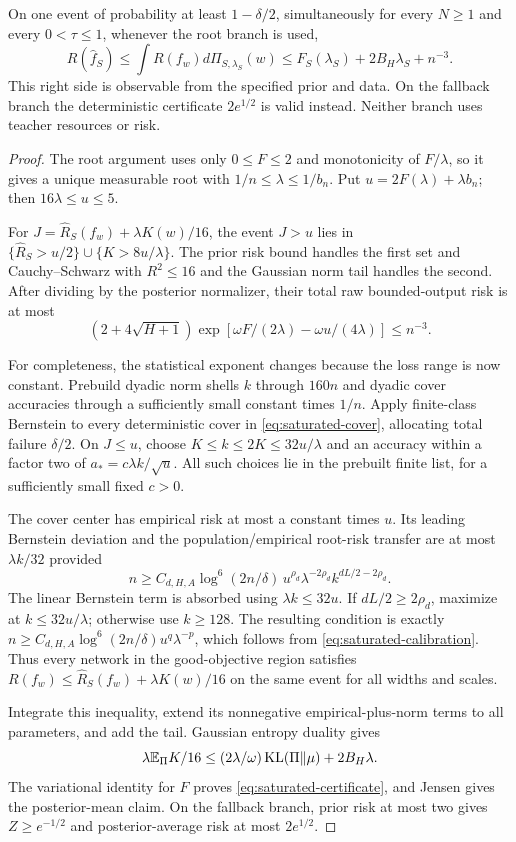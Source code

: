 \begin{theorem}
\label{thm:saturated-certificate}
On one event of probability at least $1-\delta/2$, simultaneously for every $N\ge1$ and every $0<\tau\le1$, whenever the root branch is used,
\begin{equation}
 R(\widehat f_S)\le\int R(f_w)d\Pi_{S,\lambda_S}(w)
 \le F_S(\lambda_S)+2B_H\lambda_S+n^{-3}.
 \label{eq:saturated-certificate}
\end{equation}
This right side is observable from the specified prior and data. On the fallback branch the deterministic certificate $2e^{1/2}$ is valid instead. Neither branch uses teacher resources or risk.
\end{theorem}
\begin{proof}
The root argument uses only $0\le F\le2$ and monotonicity of $F/\lambda$, so it gives a unique measurable root with $1/n\le\lambda\le1/b_n$. Put $u=2F(\lambda)+\lambda b_n$; then $16\lambda\le u\le5$.

For $J=\widehat R_S(f_w)+\lambda K(w)/16$, the event $J>u$ lies in $\{\widehat R_S>u/2\}\cup\{K>8u/\lambda\}$. The prior risk bound handles the first set and Cauchy--Schwarz with $R^2\le16$ and the Gaussian norm tail handles the second. After dividing by the posterior normalizer, their total raw bounded-output risk is at most
\[
 (2+4\sqrt{H+1})\exp[\omega F/(2\lambda)-\omega u/(4\lambda)]
 \le n^{-3}.
\]

For completeness, the statistical exponent changes because the loss range is now constant. Prebuild dyadic norm shells $k$ through $160n$ and dyadic cover accuracies through a sufficiently small constant times $1/n$. Apply finite-class Bernstein to every deterministic cover in \eqref{eq:saturated-cover}, allocating total failure $\delta/2$. On $J\le u$, choose $K\le k\le2K\le32u/\lambda$ and an accuracy within a factor two of $a_*=c\lambda k/\sqrt u$. All such choices lie in the prebuilt finite list, for a sufficiently small fixed $c>0$.

The cover center has empirical risk at most a constant times $u$. Its leading Bernstein deviation and the population/empirical root-risk transfer are at most $\lambda k/32$ provided
\[
 n\ge C_{d,H,A}\log^6(2n/\delta)\,
 u^{\rho_d}\lambda^{-2\rho_d}k^{dL/2-2\rho_d}.
\]
The linear Bernstein term is absorbed using $\lambda k\le32u$. If $dL/2\ge2\rho_d$, maximize at $k\le32u/\lambda$; otherwise use $k\ge128$. The resulting condition is exactly
$n\ge C_{d,H,A}\log^6(2n/\delta)u^q\lambda^{-p}$, which follows from \eqref{eq:saturated-calibration}. Thus every network in the good-objective region satisfies
$R(f_w)\le\widehat R_S(f_w)+\lambda K(w)/16$ on the same event for all widths and scales.

Integrate this inequality, extend its nonnegative empirical-plus-norm terms to all parameters, and add the tail. Gaussian entropy duality gives
\[
 \lambda\mathbb E_\Pi K/16\le(2\lambda/\omega)\operatorname{KL}(\Pi\Vert\mu)+2B_H\lambda.
\]
The variational identity for $F$ proves \eqref{eq:saturated-certificate}, and Jensen gives the posterior-mean claim. On the fallback branch, prior risk at most two gives $Z\ge e^{-1/2}$ and posterior-average risk at most $2e^{1/2}$.
\end{proof}

